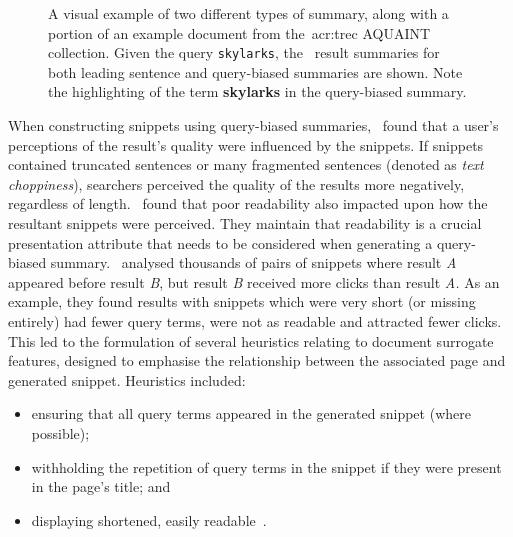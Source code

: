 \begin{figure}[t!]
    \centering
    \caption[Leading sentence and query-biased summary examples]{A visual example of two different types of summary, along with a portion of an example document from the~\gls{acr:trec} AQUAINT collection. Given the query \texttt{skylarks}, the \searchlogo~result summaries for both leading sentence and query-biased summaries are shown. Note the highlighting of the term \textbf{skylarks} in the query-biased summary.}
    \label{fig:snippet_types}
\end{figure}

When constructing snippets using query-biased summaries,~\cite{rose2007snippet_attributes} found that a user's perceptions of the result's quality were influenced by the snippets. If snippets contained truncated sentences or many fragmented sentences (denoted as \emph{text choppiness}), searchers perceived the quality of the results more negatively, regardless of length.~\cite{kanungo2009snippet_readability} found that poor readability also impacted upon how the resultant snippets were perceived. They maintain that readability is a crucial presentation attribute that needs to be considered when generating a query-biased summary.~\cite{clarke2007caption_features} analysed thousands of pairs of snippets where result \emph{A} appeared before result \emph{B}, but result \emph{B} received more clicks than result \emph{A.} As an example, they found results with snippets which were very short (or missing entirely) had fewer query terms, were not as readable and attracted fewer clicks. This led to the formulation of several heuristics relating to document surrogate features, designed to emphasise the relationship between the associated page and generated snippet. Heuristics included:

\begin{itemize}
    \item{ensuring that all query terms appeared in the generated snippet (where possible);}
    \item{withholding the repetition of query terms in the snippet if they were present in the page's title; and}
    \item{displaying shortened, easily readable~.}
\end{itemize}


